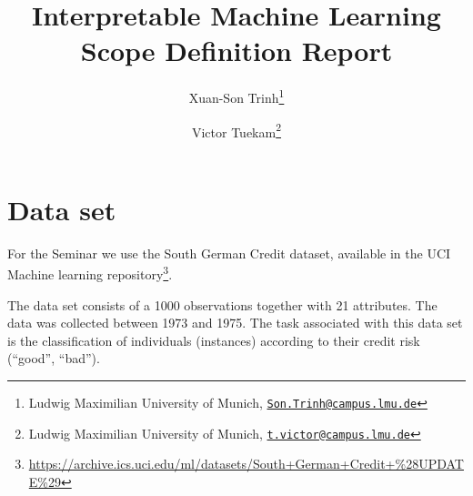 \documentclass[
]{article}
\title{Interpretable Machine Learning Scope Definition Report}
\author{Xuan-Son Trinh\footnote{Ludwig Maximilian University of Munich, \href{mailto:Son.Trinh@campus.lmu.de}{\nolinkurl{Son.Trinh@campus.lmu.de}}} \and Victor Tuekam\footnote{Ludwig Maximilian University of Munich, \href{mailto:t.victor@campus.lmu.de}{\nolinkurl{t.victor@campus.lmu.de}}}}
\date{}
\begin{document}
\maketitle

\hypertarget{data-set}{%
\section{Data set}\label{data-set}}

For the Seminar we use the South German Credit dataset, available in the UCI Machine learning repository\footnote{\url{https://archive.ics.uci.edu/ml/datasets/South+German+Credit+\%28UPDATE\%29}}.

The data set consists of a 1000 observations together with 21 attributes. The data was collected between 1973 and 1975. The task associated with this data set is the classification of individuals (instances) according to their credit risk (``good'', ``bad'').
\end{document}
